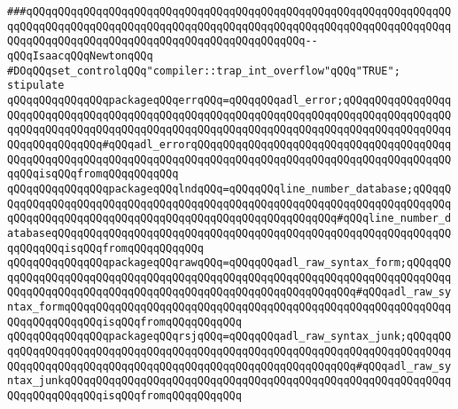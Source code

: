 \verb|###qQQqqQQqqQQqqQQqqQQqqQQqqQQqqQQqqQQqqQQqqQQqqQQqqQQqqQQqqQQqqQQqqQQqqQQqqQQqqQQqqQQqqQQqqQQqqQQqqQQqqQQqqQQqqQQqqQQqqQQqqQQqqQQqqQQqqQQqqQQqqQQqqQQqqQQqqQQqqQQqqQQqqQQqqQQqqQQqqQQqqQQq--qQQqIsaacqQQqNewtonqQQq|\newline
\newline
\newline
\newline
\verb|#DOqQQqset_controlqQQq"compiler::trap_int_overflow"qQQq"TRUE";|\newline
\newline
\verb|stipulate|\newline
\verb|qQQqqQQqqQQqqQQqpackageqQQqerrqQQq=qQQqqQQqadl_error;qQQqqQQqqQQqqQQqqQQqqQQqqQQqqQQqqQQqqQQqqQQqqQQqqQQqqQQqqQQqqQQqqQQqqQQqqQQqqQQqqQQqqQQqqQQqqQQqqQQqqQQqqQQqqQQqqQQqqQQqqQQqqQQqqQQqqQQqqQQqqQQqqQQqqQQqqQQqqQQqqQQqqQQqqQQq#qQQqadl_errorqQQqqQQqqQQqqQQqqQQqqQQqqQQqqQQqqQQqqQQqqQQqqQQqqQQqqQQqqQQqqQQqqQQqqQQqqQQqqQQqqQQqqQQqqQQqqQQqqQQqqQQqqQQqqQQqqQQqisqQQqfromqQQqqQQqqQQq|\newline
\verb|qQQqqQQqqQQqqQQqpackageqQQqlndqQQq=qQQqqQQqline_number_database;qQQqqQQqqQQqqQQqqQQqqQQqqQQqqQQqqQQqqQQqqQQqqQQqqQQqqQQqqQQqqQQqqQQqqQQqqQQqqQQqqQQqqQQqqQQqqQQqqQQqqQQqqQQqqQQqqQQqqQQqqQQqqQQq#qQQqline_number_databaseqQQqqQQqqQQqqQQqqQQqqQQqqQQqqQQqqQQqqQQqqQQqqQQqqQQqqQQqqQQqqQQqqQQqqQQqisqQQqfromqQQqqQQqqQQq|\newline
\verb|qQQqqQQqqQQqqQQqpackageqQQqrawqQQq=qQQqqQQqadl_raw_syntax_form;qQQqqQQqqQQqqQQqqQQqqQQqqQQqqQQqqQQqqQQqqQQqqQQqqQQqqQQqqQQqqQQqqQQqqQQqqQQqqQQqqQQqqQQqqQQqqQQqqQQqqQQqqQQqqQQqqQQqqQQqqQQqqQQqqQQq#qQQqadl_raw_syntax_formqQQqqQQqqQQqqQQqqQQqqQQqqQQqqQQqqQQqqQQqqQQqqQQqqQQqqQQqqQQqqQQqqQQqqQQqqQQqisqQQqfromqQQqqQQqqQQq|\newline
\verb|qQQqqQQqqQQqqQQqpackageqQQqrsjqQQq=qQQqqQQqadl_raw_syntax_junk;qQQqqQQqqQQqqQQqqQQqqQQqqQQqqQQqqQQqqQQqqQQqqQQqqQQqqQQqqQQqqQQqqQQqqQQqqQQqqQQqqQQqqQQqqQQqqQQqqQQqqQQqqQQqqQQqqQQqqQQqqQQqqQQqqQQq#qQQqadl_raw_syntax_junkqQQqqQQqqQQqqQQqqQQqqQQqqQQqqQQqqQQqqQQqqQQqqQQqqQQqqQQqqQQqqQQqqQQqqQQqqQQqisqQQqfromqQQqqQQqqQQq|\newline
